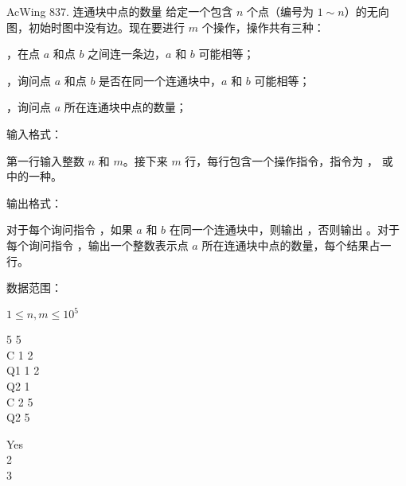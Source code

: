 \begin{titledbox}{AcWing 837. 连通块中点的数量}
    给定一个包含 $n$ 个点（编号为 $1 \sim n$）的无向图，初始时图中没有边。现在要进行 $m$ 个操作，操作共有三种：

    ，在点 $a$ 和点 $b$ 之间连一条边，$a$ 和 $b$ 可能相等；

    ，询问点 $a$ 和点 $b$ 是否在同一个连通块中，$a$ 和 $b$ 可能相等；

    ，询问点 $a$ 所在连通块中点的数量；

    输入格式：

    第一行输入整数 $n$ 和 $m$。接下来 $m$ 行，每行包含一个操作指令，指令为 ， 或  中的一种。

    输出格式：

    对于每个询问指令 ，如果 $a$ 和 $b$ 在同一个连通块中，则输出  ，否则输出  。对于每个询问指令  ，输出一个整数表示点 $a$ 所在连通块中点的数量，每个结果占一行。

    数据范围：

    $1 \le n,m \le 10^5$

    \begin{inputblock}
        5 5 \\
        C 1 2 \\
        Q1 1 2 \\
        Q2 1 \\
        C 2 5 \\
        Q2 5
    \end{inputblock}
    \begin{outputblock}
        Yes \\
        2 \\
        3
    \end{outputblock}
\end{titledbox}

